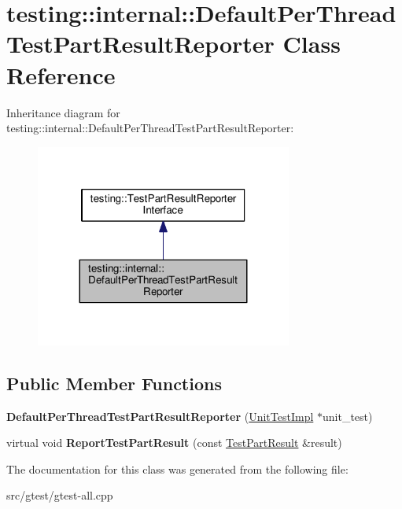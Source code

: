 \hypertarget{classtesting_1_1internal_1_1_default_per_thread_test_part_result_reporter}{}\section{testing\+:\+:internal\+:\+:Default\+Per\+Thread\+Test\+Part\+Result\+Reporter Class Reference}
\label{classtesting_1_1internal_1_1_default_per_thread_test_part_result_reporter}


Inheritance diagram for testing\+:\+:internal\+:\+:Default\+Per\+Thread\+Test\+Part\+Result\+Reporter\+:
\nopagebreak
\begin{figure}[H]
\begin{center}
\leavevmode
\includegraphics[width=239pt]{classtesting_1_1internal_1_1_default_per_thread_test_part_result_reporter__inherit__graph}
\end{center}
\end{figure}
\subsection*{Public Member Functions}
\begin{DoxyCompactItemize}
\item 
\mbox{\label{classtesting_1_1internal_1_1_default_per_thread_test_part_result_reporter_a968a846e5a90d2ffea8b2ce2746099bd}} 
{\bfseries Default\+Per\+Thread\+Test\+Part\+Result\+Reporter} (\mbox{\hyperlink{classtesting_1_1internal_1_1_unit_test_impl}{Unit\+Test\+Impl}} $\ast$unit\+\_\+test)
\item 
\mbox{\label{classtesting_1_1internal_1_1_default_per_thread_test_part_result_reporter_ac6dc08eadc4e5a2a64a91d0b6c6b3aad}} 
virtual void {\bfseries Report\+Test\+Part\+Result} (const \mbox{\hyperlink{classtesting_1_1_test_part_result}{Test\+Part\+Result}} \&result)
\end{DoxyCompactItemize}


The documentation for this class was generated from the following file\+:\begin{DoxyCompactItemize}
\item 
src/gtest/gtest-\/all.\+cpp\end{DoxyCompactItemize}
